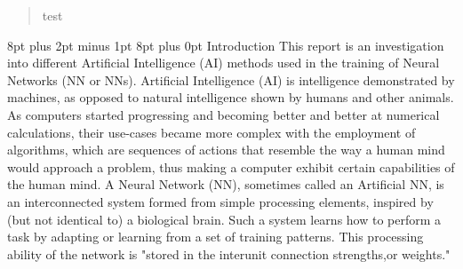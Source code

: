 \documentclass[12pt,a4paper]{article}
\makeatletter
\renewcommand\section{\@startsection {section}{1}{0mm} %
                               {8pt plus 2pt minus 1pt} %
                               {8pt plus 0pt} %
                               {\bfseries}}
\makeatother
\begin{document}


\pagebreak

\pagebreak

\begin{abstract}
test
\end{abstract}
\pagebreak

\tableofcontents %
\newpage

\listoftables
\newpage

\listoffigures
\newpage

\onehalfspace
\section{Introduction}
This report is an investigation into different Artificial Intelligence (AI) methods used in the training of Neural Networks (NN or NNs).
Artificial Intelligence (AI) is intelligence demonstrated by machines, as opposed to natural intelligence shown by humans and other animals. As computers started progressing and becoming better and better at numerical calculations, their use-cases became more complex with the employment of algorithms, which are sequences of actions that resemble the way a human mind would approach a problem, thus making a computer exhibit certain capabilities of the human mind. \cite{wang_three_2007}
A Neural Network (NN), sometimes called an Artificial NN, is an interconnected system formed from simple processing elements, inspired by (but not identical to) a biological brain. Such a system learns how to perform a task by adapting or learning from a set of training patterns. This processing ability of the network is "stored in the interunit connection strengths,or weights." \cite{gurney_introduction_1997}
\end{document}
